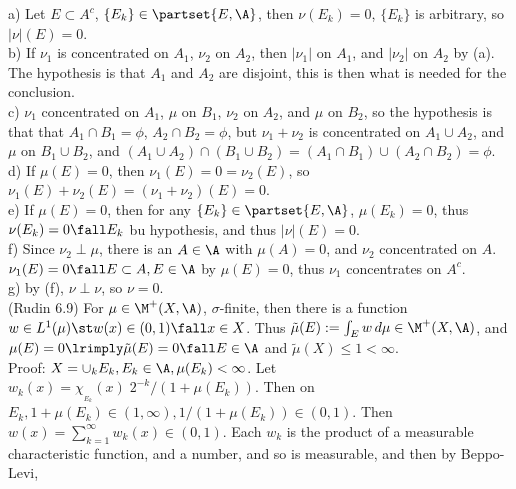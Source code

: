 \noindent
a) Let $E \subset A^c$, $\{ E_k \} \in \partset{E, \A}$, then $\nu(E_k) = 0$, $\{E_k\}$ is arbitrary, so $|\nu|(E) = 0$. \\

\noindent
b) If $\nu_1$ is concentrated on $A_1$, $\nu_2$ on $A_2$, then $|\nu_1|$ on $A_1$, and $|\nu_2|$ on $A_2$ by (a). The hypothesis is that $A_1$ and $A_2$ are disjoint, this is then what is needed for the conclusion. \\

\noindent
c) $\nu_1$ concentrated on $A_1$, $\mu$ on $B_1$, $\nu_2$ on $A_2$, and $\mu$ on $B_2$, so the hypothesis is that that $A_1 \cap B_1 = \phi$, $A_2 \cap B_2 = \phi$, but $\nu_1 + \nu_2$ is concentrated on $A_1 \cup A_2$, and $\mu$  on $B_1 \cup B_2$, and $(A_1 \cup A_2) \cap (B_1 \cup B_2) = (A_1 \cap B_1) \cup (A_2 \cap B_2) = \phi$. \\

\noindent
d) If $\mu(E) = 0$, then $\nu_1(E) = 0 = \nu_2(E)$, so $\nu_1(E) + \nu_2(E) = (\nu_1 + \nu_2)(E) = 0$.\\

\noindent
e) If $\mu(E) = 0$, then for any $\{ E_k \} \in \partset{E, \A}$, $\mu(E_k) = 0$, thus $\nu(E_k) = 0 \fall E_k$ bu hypothesis, and thus $|\nu|(E) = 0$.   \\

\noindent
f) Since $\nu_2 \perp \mu$, there is an $A \in \A$ with $\mu(A) = 0$, and $\nu_2$ concentrated on $A$. $\nu_1(E) = 0 \fall E \subset A, E \in \A$ by $\mu(E) = 0$, thus $\nu_1$ concentrates on $A^c$.  \\

\noindent
g) by (f), $\nu \perp \nu$, so $\nu = 0$.  \\


(Rudin 6.9) For $\mu \in \M^+(X, \A)$, $\sigma$-finite, then there is a function $w \in L^1(\mu) \st w(x) \in (0,1) \fall x \in X$. Thus $\tilde{\mu}(E) := \int_E w \, d\mu \in \M^+(X, \A)$, and $\mu(E) = 0 \lrimply \tilde{\mu}(E)=0 \fall E \in \A$   and $ \tilde{\mu}(X) \le 1 < \infty$. \\

\noindent
Proof: $X = \cup_k E_k, E_k \in \A, \mu(E_k) < \infty$. Let $w_k(x) = \chi_{_{E_k}}(x) \; 2^{-k}/ (1+\mu(E_k))$. Then on $E_k, 1+\mu(E_k) \in (1,\infty), 1/ (1+\mu(E_k)) \in (0,1)$. Then $w(x) = \sum_{k=1}^\infty w_k(x) \in (0,1)$. Each $w_k$ is the product of a measurable characteristic function, and a number, and so is measurable, and then by Beppo-Levi,

